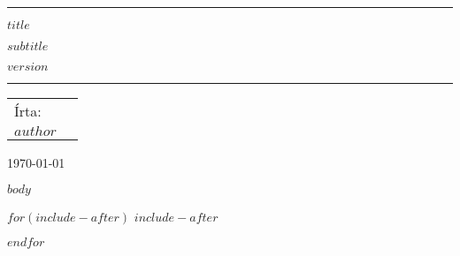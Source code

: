 \documentclass[oneside, a4paper]{report}
\begin{document}
\begin{titlepage}
  \scshape
  \center
  \vspace{1cm}
  
  
  \raisebox{-\baselineskip}{\rule{\textwidth}{1px}}
  \rule{\textwidth}{1px}
  \vspace{0.2cm}
  
  {\huge{{$title$}}}\par \vspace{0.1cm}
  {\Large{{$subtitle$}}}\par \vspace{0.1cm}
  $version$

  \rule{\textwidth}{2px}
  
  \vspace{1cm}
  
  \begin{tabularx}{\textwidth}{X r}
      Írta:\\
      \large{$author$}\\
  \end{tabularx}
  
  \vspace{2.3cm}
  
  
  \vfill
  \today
  
\end{titlepage}

$body$

$for(include-after)$
$include-after$

$endfor$
\end{document}
